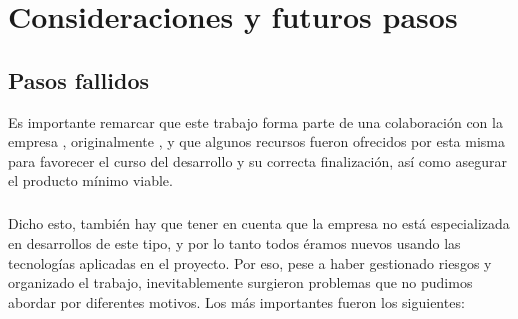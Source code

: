 \documentclass{subfiles}
\begin{document}
    \chapter{Consideraciones y futuros pasos}
    \label{chap:6}

    \section{Pasos fallidos}
    \label{sec:pasos_fallidos}
    
    Es importante remarcar que este trabajo forma parte de una colaboración con la empresa \thirdera, originalmente \silverstorm, y que algunos recursos fueron ofrecidos por esta misma para favorecer el curso del desarrollo y su correcta finalización, así como asegurar el producto mínimo viable.

    \paragraph{}
    Dicho esto, también hay que tener en cuenta que la empresa no está especializada en desarrollos de este tipo, y por lo tanto todos éramos nuevos usando las tecnologías aplicadas en el proyecto. Por eso, pese a haber gestionado riesgos y organizado el trabajo, inevitablemente surgieron problemas que no pudimos abordar por diferentes motivos. Los más importantes fueron los siguientes:
\end{document}
